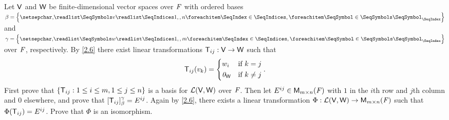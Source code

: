 \begin{ex}\label{ex:2.4.21}
  Let \(\mathsf{V}\) and \(\mathsf{W}\) be finite-dimensional vector spaces over \(\mathit{F}\) with ordered bases \(\beta = \set{\seq{v}{1,,n}}\) and \(\gamma = \set{\seq{w}{1,,m}}\) over \(\mathit{F}\), respectively.
  By \cref{2.6} there exist linear transformations \(\mathsf{T}_{i j} : \mathsf{V} \to \mathsf{W}\) such that
  \[
    \mathsf{T}_{i j}(v_k) = \begin{dcases}
      w_i      & \text{if } k = j    \\
      \mathit{0}_{\mathsf{W}} & \text{if } k \neq j
    \end{dcases}.
  \]
  First prove that \(\left\lbrace\mathsf{T}_{i j} : 1 \leq i \leq m, 1 \leq j \leq n\right\rbrace\) is a basis for \(\mathcal{L}(\mathsf{V}, \mathsf{W})\) over \(\mathit{F}\).
  Then let \(E^{i j} \in \mathsf{M}_{{m} \times n}({\mathit{F}})\) with \(1\) in the \(i\)th row and \(j\)th column and \(0\) elsewhere, and prove that \([\mathsf{T}_{i j}]_{\beta}^{\gamma} = E^{i j}\).
  Again by \cref{2.6}, there exists a linear transformation \(\Phi : \mathcal{L}(\mathsf{V}, \mathsf{W}) \to \mathsf{M}_{{m} \times n}({\mathit{F}})\) such that \(\Phi(\mathsf{T}_{i j}) = E^{i j}\).
  Prove that \(\Phi\) is an isomorphism.
\end{ex}

